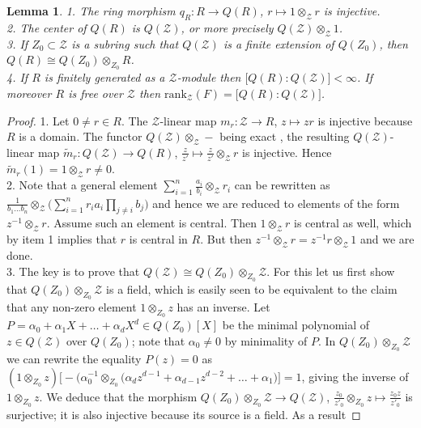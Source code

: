 \documentclass[11pt]{amsart}
\newtheorem{lem}[teo]{Lemma}
\begin{document}
\begin{lem}\label{lemTrucsGenerauxQR}
1. The ring morphism $q_R : R \to Q(R)$, $r \mapsto 1 \otimes_{\mathcal{Z}} r$ is injective.
\\2. The center of $Q(R)$ is $Q( \mathcal{Z})$, or more precisely $Q( \mathcal{Z}) \otimes _{\mathcal{Z}} 1$.
\\3. If $Z_0 \subset \mathcal{Z}$ is a subring such that $Q(\mathcal{Z})$ is a finite extension of $Q(Z_0)$, then $Q(R) \cong Q(Z_0) \otimes_{Z_0} R$.
\\4. If $R$ is finitely generated as a $\mathcal{Z}$-module then $\bigl[ Q(R):Q(\mathcal{Z}) \bigr] < \infty$. If moreover $R$ is free over $\mathcal{Z}$ then $\mathrm{rank}_{\mathcal{Z}}(F) = \bigl[ Q(R):Q(\mathcal{Z}) \bigr]$.
\end{lem}
\begin{proof}
1. Let $0 \neq r \in R$. The $\mathcal{Z}$-linear map $m_r : \mathcal{Z} \to R$, $z \mapsto zr$ is injective because $R$ is a domain. The functor $Q(\mathcal{Z}) \otimes_{\mathcal{Z}} -$ being exact \cite[Th.\,3.1.20]{Rowen}, the resulting $Q(\mathcal{Z})$-linear map $\widetilde{m}_r : Q(\mathcal{Z}) \to Q(R)$, $\textstyle \frac{z}{z'} \mapsto \frac{z}{z'} \otimes_{\mathcal{Z}} r$ is injective. Hence $\widetilde{m}_r(1) = 1 \otimes_{\mathcal{Z}} r \neq 0$.
\\2. Note that a general element $\textstyle \sum_{i=1}^n \frac{a_i}{b_i} \otimes_{\mathcal{Z}} r_i$ can be rewritten as $\textstyle \frac{1}{b_1\ldots b_n} \otimes_{\mathcal{Z}} \bigl( \sum_{i=1}^n r_i a_i\prod_{j \neq i}b_j \bigr)$ and hence we are reduced to elements of the form $z^{-1} \otimes_{\mathcal{Z}} r$. Assume such an element is central. Then $1 \otimes _{\mathcal{Z}} r$ is central as well, which by item 1 implies that $r$ is central in $R$. But then $z^{-1} \otimes_{\mathcal{Z}} r = z^{-1}r \otimes_{\mathcal{Z}} 1$ and we are done.
\\3. The key is to prove that $Q(\mathcal{Z}) \cong Q(Z_0) \otimes_{Z_0} \mathcal{Z}$. For this let us first show that $Q(Z_0) \otimes_{Z_0} \mathcal{Z}$ is a field, which is easily seen to be equivalent to the claim that any non-zero element $1 \otimes_{Z_0} z$ has an inverse. Let $P = \alpha_0 + \alpha_1X + \ldots + \alpha_dX^d \in Q(Z_0)[X]$ be the minimal polynomial of $z \in Q(\mathcal{Z})$ over $Q(Z_0)$; note that $\alpha_0 \neq 0$ by minimality of $P$. In $ Q(Z_0) \otimes_{Z_0} \mathcal{Z}$ we can rewrite the equality $P(z) = 0$ as $(1 \otimes_{Z_0} z)\bigl[ -(\alpha_0^{-1} \otimes_{Z_0} \bigl( \alpha_d z^{d-1} + \alpha_{d-1}z^{d-2} + \ldots + \alpha_1 \bigr) \bigr] = 1$, giving the inverse of $1 \otimes_{Z_0} z$. We deduce that the morphism $Q(Z_0) \otimes_{Z_0} \mathcal{Z} \to Q(\mathcal{Z})$, $\frac{z_0}{z'_0} \otimes_{Z_0} z \mapsto \frac{z_0z}{z'_0}$ is surjective; it is also injective because its source is a field. As a result

\end{proof}
\end{document}
